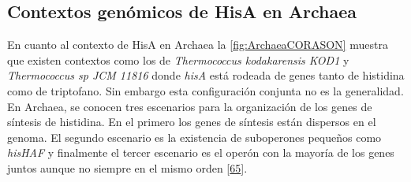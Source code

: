 \documentclass[12pt,twoside]{reedthesis}
\begin{document}
  \subsection{Contextos genómicos de HisA en
  Archaea}\label{contextos-genomicos-de-hisa-en-archaea}
  
  En cuanto al contexto de HisA en Archaea la \autoref{fig:ArchaeaCORASON}
  muestra que existen contextos como los de \emph{Thermococcus
  kodakarensis KOD1} y \emph{Thermococcus sp JCM 11816} donde \emph{hisA}
  está rodeada de genes tanto de histidina como de triptofano. Sin embargo
  esta configuración conjunta no es la generalidad. En Archaea, se conocen
  tres escenarios para la organización de los genes de síntesis de
  histidina. En el primero los genes de síntesis están dispersos en el
  genoma. El segundo escenario es la existencia de suboperones pequeños
  como \emph{hisHAF} y finalmente el tercer escenario es el operón con la
  mayoría de los genes juntos aunque no siempre en el mismo orden
  {[}\protect\hyperlink{ref-fondi_evolution_2009}{65}{]}.
  
\end{document}
